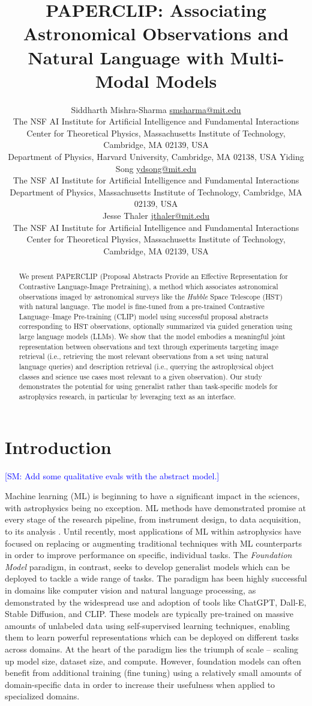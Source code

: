 \documentclass[10pt]{article} %
\title{\textsc{PAPERCLIP}: Associating Astronomical Observations and Natural Language with Multi-Modal Models}
\author{\name Siddharth Mishra-Sharma \email \href{mailto:smsharma@mit.edu}{smsharma@mit.edu} \\
      \addr The NSF AI Institute for Artificial Intelligence and Fundamental Interactions\\
      Center for Theoretical Physics, Massachusetts Institute of Technology, Cambridge, MA 02139, USA \\
      Department of Physics, Harvard University, Cambridge, MA 02138, USA
      \AND
      \name Yiding Song \email \href{mailto:ydsong@mit.edu}{ydsong@mit.edu} \\
      \addr The NSF AI Institute for Artificial Intelligence and Fundamental Interactions\\
      Department of Physics, Massachusetts Institute of Technology, Cambridge, MA 02139, USA \\
      \AND
      \name Jesse Thaler \email \href{mailto:jthaler@mit.edu}{jthaler@mit.edu} \\
      \addr The NSF AI Institute for Artificial Intelligence and Fundamental Interactions\\
      Center for Theoretical Physics, Massachusetts Institute of Technology, Cambridge, MA 02139, USA \\
}
\newcommand{\SM}[1]{\textcolor{blue}{[SM: #1]}}
\newcommand{\hubble}{\emph{Hubble}\xspace}
\begin{document}
\maketitle

\thispagestyle{firstpage}


\begin{abstract}
We present PAPERCLIP (Proposal Abstracts Provide an Effective Representation for Contrastive Language-Image Pretraining), a method which associates astronomical observations imaged by astronomical surveys like the \hubble Space Telescope (HST) with natural language. The model is fine-tuned from a pre-trained Contrastive Language–Image Pre-training (CLIP) model using successful proposal abstracts corresponding to HST observations, optionally summarized via guided generation using large language models (LLMs). We show that the model embodies a meaningful joint representation between observations and text through experiments targeting image retrieval (i.e., retrieving the most relevant observations from a set using natural language queries) and description retrieval (i.e., querying the astrophysical object classes and science use cases most relevant to a given observation). Our study demonstrates the potential for using generalist rather than task-specific models for astrophysics research, in particular by leveraging text as an interface.
\end{abstract}

\tableofcontents

\section{Introduction}
\label{sec:intro}

\SM{Add some qualitative evals with the abstract model.}

Machine learning (ML) is beginning to have a significant impact in the sciences, with astrophysics being no exception.
%
ML methods have demonstrated promise at every stage of the research pipeline, from instrument design, to data acquisition, to its analysis \citep{huertas2022dawes}.
%
Until recently, most applications of ML within astrophysics have focused on replacing or augmenting traditional techniques with ML counterparts in order to improve performance on specific, individual tasks.
%
The \emph{Foundation Model} paradigm, in contrast, seeks to develop generalist models which can be deployed to tackle a wide range of tasks.
%
The paradigm has been highly successful in domains like computer vision and natural language processing, as demonstrated by the widespread use and adoption of tools like ChatGPT, Dall-E, Stable Diffusion, and CLIP.
%
These models are typically pre-trained on massive amounts of unlabeled data using self-supervised learning techniques, enabling them to learn powerful representations which can be deployed on different tasks across domains.
%
At the heart of the paradigm lies the triumph of scale -- scaling up model size, dataset size, and compute.
%
However, foundation models can often benefit from additional training ({fine tuning}) using a relatively small amounts of domain-specific data in order to increase their usefulness when applied to specialized domains.
\end{document}
